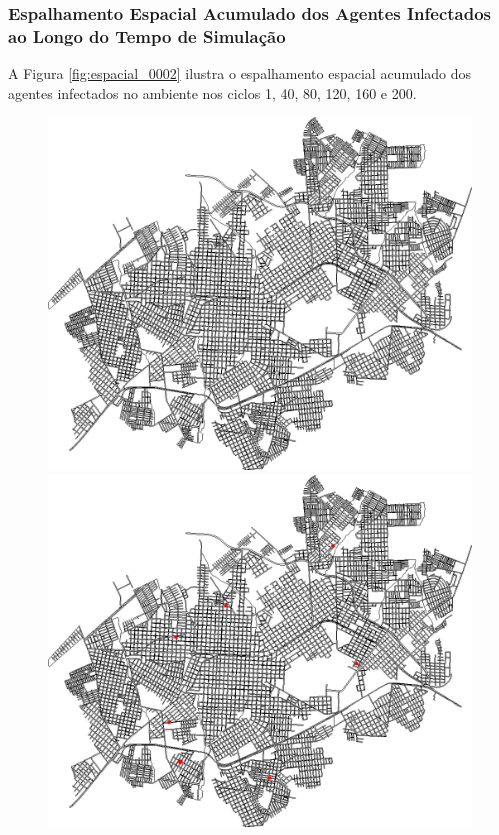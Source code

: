 \subsubsection{Espalhamento Espacial Acumulado dos Agentes Infectados ao Longo do Tempo de Simulação}

A Figura \ref{fig:espacial_0002} ilustra o espalhamento espacial acumulado dos agentes infectados no ambiente nos ciclos 1, 40, 80, 120, 160 e 200.

\begin{figure}[H]
  \centering
  \begin{minipage}{.5\textwidth}
    \centering
    \includegraphics[width=1.0\textwidth]{Figuras/Resultados/0002/Saidas/MonteCarlo_0/Simulacao_0/Acumulado/00000.png}
    \captionsetup{labelformat=empty}
  \end{minipage}%
  \begin{minipage}{.5\textwidth}
    \centering
    \includegraphics[width=1.0\textwidth]{Figuras/Resultados/0002/Saidas/MonteCarlo_0/Simulacao_0/Acumulado/00004.png}

\end{minipage}
\end{figure}
